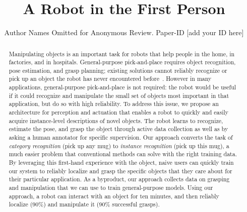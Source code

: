 \documentclass[conference]{IEEEtran}
\begin{document}


\title{A Robot in the First Person}
\author{Author Names Omitted for Anonymous Review. Paper-ID [add your ID here]}

\maketitle


\begin{abstract}
Manipulating objects is an important task for robots that help people
in the home, in factories, and in hospitals.  General-purpose
pick-and-place requires object recognition, pose estimation, and grasp
planning; existing solutions cannot reliably recognize or pick up an
object the robot has never encountered before~\citep{}.  However in
many applications, general-purpose pick-and-place is not required: the
robot would be useful if it could recognize and manipulate the small
set of objects most important in that application, but do so with high
reliability.  To address this issue, we propose an architecture for
perception and actuation that enables a robot to quickly and easily
acquire instance-level descriptions of novel objects.  The robot
learns to recognize, estimate the pose, and grasp the object through
active data collection as well as by asking a human annotator for
specific supervision.  Our approach converts the task of {\em
  category recognition} (pick up any mug) to {\em instance
  recognition} (pick up this mug), a much easier problem that conventional
methods can solve with the right training data.  By leveraging
this first-hand experience with the object, naive users can
quickly train our system to reliably localize and grasp the specific
objects that they care about for their particular application.
As a byproduct, our approach collects data on grasping and
manipulation that we can use to train general-purpose models. Using
our approach, a robot can interact with an object for ten minutes, and
then reliably localize (90\%) and manipulate it (90\% successful
grasps).


\end{abstract}
\end{document}
